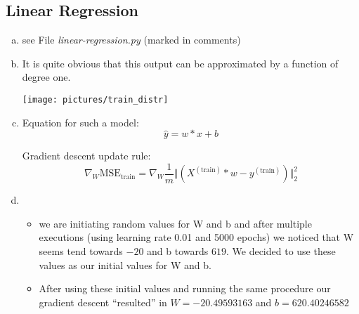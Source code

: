 \documentclass[12pt]{article}
\begin{document}

\setcounter{section}{3}

\subsection{Linear Regression}
\begin{enumerate}[a)]

    \item 
        see File \textit{linear-regression.py} (marked in comments)

    \item 
        It is quite obvious that this output can be approximated by a function of degree one.\\
        \begin{center}
            \texttt{[image: pictures/train\_distr]}\\
        \end{center}

    \item 
        Equation for such a model:
        $$ \hat{y} = w*x + b $$

        Gradient descent update rule:
        $$ \nabla_W \text{MSE}_\text{train} = \nabla_W \frac{1}{m} \Vert (X^{(\text{train})} * w - y^{(\text{train})}) \Vert^2_2 $$

    \item 
        \begin{itemize}
            \item 
                we are initiating random values for W and b and after multiple executions (using learning rate 0.01 and 5000 epochs) we noticed that W seems tend towards $-20$ and b towards $619$. We decided to use these values as our initial values for W and b.

            \item
                After using these initial values and running the same procedure our gradient descent ``resulted'' in $W = -20.49593163$ and $b = 620.40246582$
        \end{itemize}


\end{enumerate}
\end{document}
